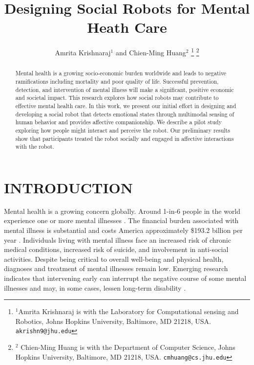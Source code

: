 \documentclass[letterpaper, 10 pt, conference]{ieeeconf}  %
\title{\LARGE \bf
Designing Social Robots for Mental Heath Care
}
\author{Amrita Krishnaraj$^{1}$ and Chien-Ming Huang$^{2}$%
\thanks{$^{1}$Amrita Krishnaraj is with the Laboratory for Computational sensing and Robotics,
        Johns Hopkins University, Baltimore, MD 21218, USA.
        {\tt\small akrishn9@jhu.edu}}%
\thanks{$^{2}$ Chien-Ming Huang is with the Department of Computer Science, Johns Hopkins University, Baltimore, MD 21218, USA.
        {\tt\small cmhuang@cs.jhu.edu}}%
}
\begin{document}
\maketitle
\thispagestyle{empty}
\pagestyle{empty}


\begin{abstract}

Mental health is a growing socio-economic burden worldwide and leads to negative ramifications including mortality and poor quality of life. Successful prevention, detection, and intervention of mental illness will make a significant, positive economic and societal impact. This research explores how social robots may contribute to effective mental health care. In this work, we present our initial effort in designing and developing  a social robot that detects emotional states through multimodal sensing of human behavior and provides affective companionship. We describe a pilot study exploring how people might interact and perceive the robot. Our preliminary results show that participants treated the robot socially and engaged in affective interactions with the robot. 


\end{abstract}


\section{INTRODUCTION}

Mental health is a growing concern globally. Around 1-in-6 people in the world experience one or more mental illnesses \cite{r1}. The financial burden associated with mental illness is substantial and costs America approximately \$193.2 billion per year \cite{r3}. Individuals living with mental illness face an increased risk of chronic medical conditions, increased risk of suicide, and involvement in anti-social activities. Despite being critical to overall well-being and physical health, diagnoses and treatment of mental illnesses remain low. Emerging research indicates that intervening early can interrupt the negative course of some mental illnesses and may, in some cases, lessen long-term disability \cite{r2}. 
\end{document}
